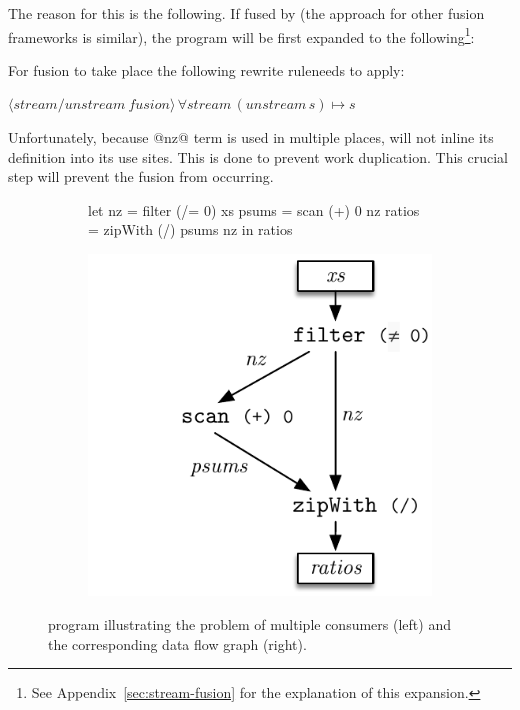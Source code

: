 \documentclass[preamble.tex]{subfiles}
\begin{document}
The reason for this is the following. If fused by \StreamFusion\isf (the approach for other fusion frameworks is similar), the program will be first expanded to the following\footnote{See Appendix~\ref{sec:stream-fusion} for the explanation of this expansion.}:


For fusion to take place the following rewrite rule\irwrules needs to apply:

$\langle {}\rangle\, \forall stream\, (unstream\, s)\mapsto s$

Unfortunately, because @nz@ term is used in multiple places, \GHC will not inline its definition into its use sites. This is done to prevent work duplication. This crucial step will prevent the fusion from occurring.

\begin{figure}

\begin{subfigure}{.5\textwidth}%
\begin{hscode}
let nz     = filter (/= 0) xs
    psums  = scan (+) 0 nz
    ratios = zipWith (/) psums nz
in  ratios
\end{hscode}
\end{subfigure}%
%
\begin{subfigure}{.5\textwidth}%
\includegraphics[center,scale=0.85]{img/ratios}%
\end{subfigure}%

\caption{ program illustrating the problem of multiple consumers (left) and the corresponding data flow graph (right).}
\label{fig:ratios}
\end{figure}
\end{document}

